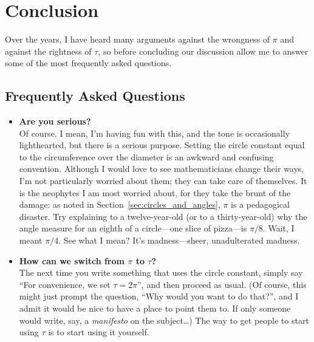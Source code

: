 
\section{Conclusion}
\label{sec:conclusion}

Over the years, I have heard many arguments against the wrongness of $\pi$ and against the rightness of $\tau$, so before concluding our discussion allow me to answer some of the most frequently asked questions.

  \subsection{Frequently Asked Questions} %
  \label{sec:faq}

\begin{itemize}

  \item \textbf{Are you serious?} \\ Of course. I mean, I'm having fun with this, and the tone is occasionally lighthearted, but there is a serious purpose. Setting the circle constant equal to the circumference over the diameter is an awkward and confusing convention. Although I would love to see mathematicians change their ways, I'm not particularly worried about them; they can take care of themselves. It is the neophytes I am most worried about, for they take the brunt of the damage: as noted in Section~\ref{sec:circles_and_angles}, $\pi$ is a pedagogical disaster. Try explaining to a twelve-year-old (or to a thirty-year-old) why the angle measure for an eighth of a circle---one slice of pizza---is $\pi/8$. Wait, I meant $\pi/4$. See what I mean? It's madness---sheer, unadulterated madness.

  \item \textbf{How can we switch from $\pi$ to $\tau$?} \\ The next time you write something that uses the circle constant, simply say ``For convenience, we set $\tau = 2\pi$'', and then proceed as usual. (Of course, this might just prompt the question, ``Why would you want to do that?'', and I admit it would be nice to have a place to point them to. If only someone would write, say, a \emph{manifesto} on the subject\ldots) The way to get people to start using $\tau$ is to start using it yourself.


\end{itemize}

